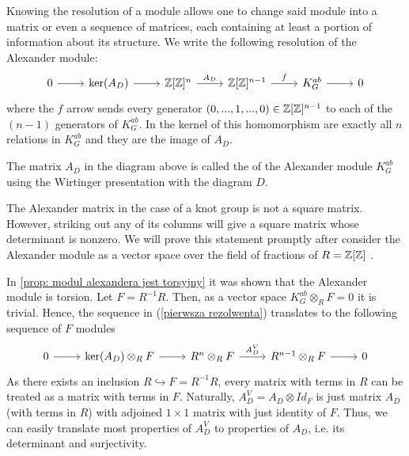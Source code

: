 Knowing the resolution of a module allows one to change said module into a matrix or even a sequence of matrices, each containing at least a portion of information about its structure.
We write the following resolution of the Alexander module:
\begin{equation}\label{pierwsza rezolwenta}
  \begin{tikzcd}
    0\arrow[r] & \ker(A_D)\arrow[r] & \Z[\Z]^{n}\arrow[r, "A_D"] & \Z[\Z]^{n-1}\arrow[r, "f"] & K_G^{ab}\arrow[r] & 0
  \end{tikzcd}
\end{equation}
where the $f$ arrow sends every generator $(0,..., 1,...,0)\in\operatorname{\mathbb{Z}}[\operatorname{\mathbb{Z}}]^{n-1}$ to each of the $(n-1)$ generators of $K_G^{ab}$. In the kernel of this homomorphism are exactly all $n$ relations in $K_G^{ab}$ and they are the image of $A_D$.

\begin{definition}\label{alexander matrix def}
  The matrix $A_D$ in the diagram above is called the  of the Alexander module $K_G^{ab}$ using the Wirtinger presentation with the diagram $D$.
\end{definition}

The Alexander matrix in the case of a knot group is not a square matrix. However, striking out any of its columns will give a square matrix whose determinant is nonzero. We will prove this statement promptly after consider the Alexander module as a vector space over the field of fractions of $R=\operatorname{\mathbb{Z}}[\operatorname{\mathbb{Z}}]$ \cite[Chapter~3]{atiyah}.

In \cref{prop: modul alexandera jest torsyjny} it was shown that the Alexander module is torsion. Let $F=R^{-1}R$. Then, as a vector space $K_G^{ab}\otimes_R F=0$ it is trivial. Hence, the sequence in (\ref{pierwsza rezolwenta}) translates to the following sequence of $F$ modules
\begin{equation}\label{resolution vector spaces}
  \begin{tikzcd}
    0\arrow[r] & \ker(A_D)\otimes_RF \arrow[r] & R^n\otimes_R F \arrow[r, "A_D^V"] & R^{n-1}\otimes_R F \arrow[r] & 0
  \end{tikzcd}
\end{equation}
As there exists an inclusion $R\hookrightarrow F=R^{-1}R$, every matrix with terms in $R$ can be treated as a matrix with terms in $F$. Naturally, $A_D^V=A_D\otimes Id_{F}$ is just matrix $A_D$ (with terms in $R$) with adjoined $1\times 1$ matrix with just identity of $F$. Thus, we can easily translate most properties of $A_D^V$ to properties of $A_D$, i.e. its determinant and surjectivity.%

